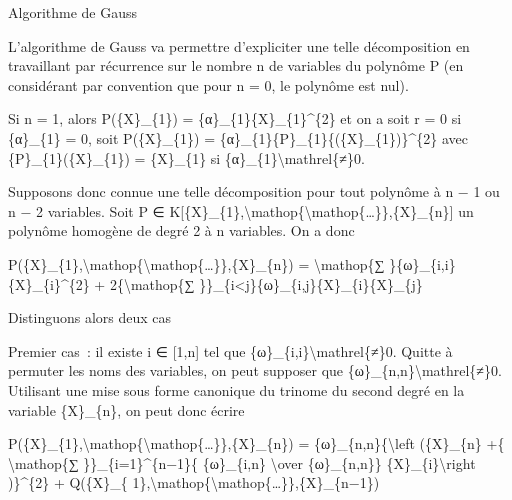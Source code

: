 \documentclass[]{article}
\begin{document}
Algorithme de Gauss

L'algorithme de Gauss va permettre d'expliciter une telle décomposition
en travaillant par récurrence sur le nombre n de variables du polynôme P
(en considérant par convention que pour n = 0, le polynôme est nul).

Si n = 1, alors P(\{X\}\_\{1\}) = \{α\}\_\{1\}\{X\}\_\{1\}\^{}\{2\} et
on a soit r = 0 si \{α\}\_\{1\} = 0, soit P(\{X\}\_\{1\}) =
\{α\}\_\{1\}\{P\}\_\{1\}\{(\{X\}\_\{1\})\}\^{}\{2\} avec
\{P\}\_\{1\}(\{X\}\_\{1\}) = \{X\}\_\{1\} si
\{α\}\_\{1\}\textbackslash{}mathrel\{≠\}0.

Supposons donc connue une telle décomposition pour tout polynôme à n − 1
ou n − 2 variables. Soit P ∈
K{[}\{X\}\_\{1\},\textbackslash{}mathop\{\textbackslash{}mathop\{\ldots{}\}\},\{X\}\_\{n\}{]}
un polynôme homogène de degré 2 à n variables. On a donc

P(\{X\}\_\{1\},\textbackslash{}mathop\{\textbackslash{}mathop\{\ldots{}\}\},\{X\}\_\{n\})
= \textbackslash{}mathop\{∑ \}\{ω\}\_\{i,i\}\{X\}\_\{i\}\^{}\{2\} +
2\{\textbackslash{}mathop\{∑
\}\}\_\{i\textless{}j\}\{ω\}\_\{i,j\}\{X\}\_\{i\}\{X\}\_\{j\}

Distinguons alors deux cas

Premier cas~: il existe i ∈ {[}1,n{]} tel que
\{ω\}\_\{i,i\}\textbackslash{}mathrel\{≠\}0. Quitte à permuter les noms
des variables, on peut supposer que
\{ω\}\_\{n,n\}\textbackslash{}mathrel\{≠\}0. Utilisant une mise sous
forme canonique du trinome du second degré en la variable \{X\}\_\{n\},
on peut donc écrire

P(\{X\}\_\{1\},\textbackslash{}mathop\{\textbackslash{}mathop\{\ldots{}\}\},\{X\}\_\{n\})
= \{ω\}\_\{n,n\}\{\textbackslash{}left (\{X\}\_\{n\} +\{
\textbackslash{}mathop\{∑ \}\}\_\{i=1\}\^{}\{n−1\}\{ \{ω\}\_\{i,n\}
\textbackslash{}over \{ω\}\_\{n,n\}\} \{X\}\_\{i\}\textbackslash{}right
)\}\^{}\{2\} + Q(\{X\}\_\{
1\},\textbackslash{}mathop\{\textbackslash{}mathop\{\ldots{}\}\},\{X\}\_\{n−1\})
\end{document}
